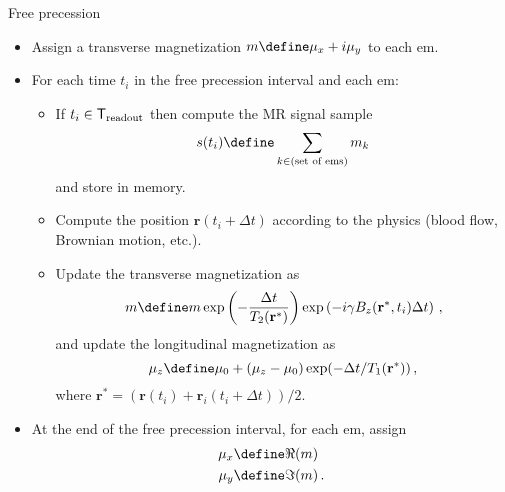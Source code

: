 \documentclass{beamer}
\begin{document}
\begin{frame}{Free precession}
\begin{itemize}
\item Assign a transverse magnetization $m \define \mu_x+i\mu_y$ to each em.
\item For each time $t_i$ in the free precession interval and each em:
\begin{itemize}
\item If $t_i \in \mathsf{T}_{\rm readout}$ then compute the MR signal sample
\begin{equation*}
s(t_i) \define \sum_{k \in \text{(set of ems)}} m_k
\end{equation*}
and store in memory.
\item Compute the position $\mathbf{r}(t_i+\Delta t)$ according to the physics (blood flow, Brownian motion, etc.).
\item Update the transverse magnetization as
\begin{equation*}
m \define m\exp\left(-\frac{\Delta t}{T_2(\mathbf{r}^*)}\right)\exp\left(-i\gamma B_z(\mathbf{r}^*,t_i)\Delta t\right)\,,
\end{equation*}
and update the longitudinal magnetization as
\begin{equation*}
\mu_z \define \mu_0 + (\mu_z-\mu_0)\exp(-\Delta t/T_1(\mathbf{r}^*))\,,
\end{equation*}
where $\mathbf{r}^* = (\mathbf{r}(t_i)+\mathbf{r}_i(t_i+\Delta t))/2$.
\end{itemize}
\end{itemize}
\end{frame}

\begin{frame}
\begin{itemize}
\item At the end of the free precession interval, for each em, assign
\begin{equation*}
\begin{aligned}
\mu_x &\define \Re(m)\\
\mu_y &\define \Im(m)\,.
\end{aligned}
\end{equation*}
\end{itemize}
\end{frame}
\end{document}

